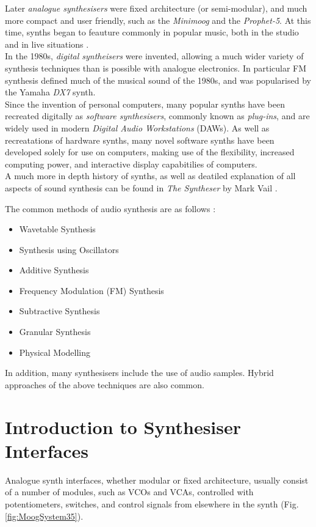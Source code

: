 \documentclass[11pt, oneside]{report}   	%
\begin{document}
Later \emph{analogue synthesisers} were fixed architecture (or semi-modular), and much more compact and user friendly, such as the \emph{Minimoog} and the \emph{Prophet-5}. At this time, synths began to feauture commonly in popular music, both in the studio and in live situations \cite{Synth}.\\
In the 1980s, \emph{digital syntheisers} were invented, allowing a much wider variety of synthesis techniques than is possible with analogue electronics. In particular FM synthesis defined much of the musical sound of the 1980s, and was popularised by the Yamaha \emph{DX7} synth.\\
Since the invention of personal computers, many popular synths have been recreated digitally as \emph{software synthesisers}, commonly known as \emph{plug-ins}, and are widely used in modern \emph{Digital Audio Workstations} (DAWs). As well as recreatations of hardware synths, many novel software synths have been developed solely for use on computers, making use of the flexibility, increased computing power, and interactive display capabitilies of computers.\\
A much more in depth history of synths, as well as deatiled explanation of all aspects of sound synthesis can be found in \emph{The Syntheser} by Mark Vail \cite{Synth}.

The common methods of audio synthesis are as follows \cite{SynthTypes}:
\begin{itemize}
	\vspace{-10pt}
	\setlength\itemsep{-1.2em}
	\item Wavetable Synthesis
	\item Synthesis using Oscillators
	\item Additive Synthesis
	\item Frequency Modulation (FM) Synthesis
	\item Subtractive Synthesis
	\item Granular Synthesis
	\item Physical Modelling
		\vspace{-10pt}
\end{itemize}
In addition, many synthesisers include the use of audio samples. Hybrid approaches of the above techniques are also common.

\section{Introduction to Synthesiser Interfaces}
Analogue synth interfaces, whether modular or fixed architecture, usually consist of a number of modules, such as VCOs and VCAs, controlled with potentiometers, switches, and control signals from elsewhere in the synth (Fig. \ref{fig:MoogSystem35}). 
\end{document}
